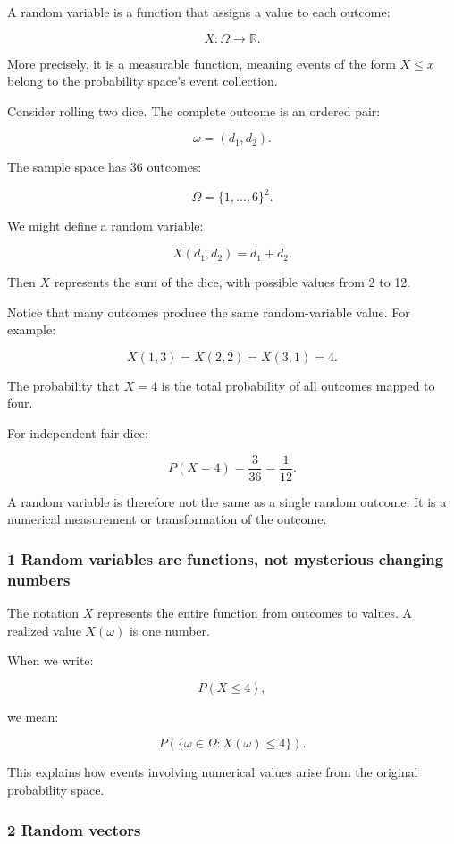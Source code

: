 A random variable is a function that assigns a value to each outcome:

\[
 \boxed{X:\Omega\rightarrow\mathbb R}.
\]

More precisely, it is a measurable function, meaning events of the form \(X\le x\) belong to the probability space's event collection.

Consider rolling two dice. The complete outcome is an ordered pair:

\[
 \omega=(d_1,d_2).
\]

The sample space has 36 outcomes:

\[
 \Omega=\{1,\ldots,6\}^2.
\]

We might define a random variable:

\[
 X(d_1,d_2)=d_1+d_2.
\]

Then \(X\) represents the sum of the dice, with possible values from 2 to 12.

Notice that many outcomes produce the same random-variable value. For example:

\[
 X(1,3)=X(2,2)=X(3,1)=4.
\]

The probability that \(X=4\) is the total probability of all outcomes mapped to four.

For independent fair dice:

\[
 P(X=4)=\frac3{36}=\frac1{12}.
\]

A random variable is therefore not the same as a single random outcome. It is a numerical measurement or transformation of the outcome.

\subsubsection{1 Random variables are functions, not mysterious changing numbers}\label{02-foundations-ii-ch023-random-variables-are-functions-not-mysterious-changing-numbers}

The notation \(X\) represents the entire function from outcomes to values. A realized value \(X(\omega)\) is one number.

When we write:

\[
 P(X\le4),
\]

we mean:

\[
 P(\{\omega\in\Omega:X(\omega)\le4\}).
\]

This explains how events involving numerical values arise from the original probability space.

\subsubsection{2 Random vectors}\label{02-foundations-ii-ch023-random-vectors}

